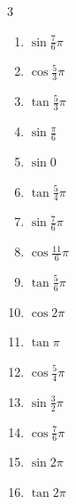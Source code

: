 \begin{multicols}{3}
\begin{enumerate}
  \item $\displaystyle \sin{\frac{7}{6}\pi}$

  \item $\displaystyle \cos{\frac{5}{3}\pi}$

  \item $\displaystyle \tan{\frac{5}{3}\pi}$

  \item $\displaystyle \sin{\frac{\pi}{6}}$

  \item $\displaystyle \sin{0}$
        \phantom{$\displaystyle =0$}

  \item $\displaystyle \tan{\frac{5}{4}\pi}$
        \phantom{$\displaystyle =1$}

  \item $\displaystyle \sin{\frac{7}{6}\pi}$

  \item $\displaystyle \cos{\frac{11}{6}\pi}$

  \item $\displaystyle \tan{\frac{5}{6}\pi}$

  \item $\displaystyle \cos{2\pi}$
        \phantom{$\displaystyle =1$}

  \item $\displaystyle \tan{\pi}$
        \phantom{$\displaystyle =0$}

  \item $\displaystyle \cos{\frac{5}{4}\pi}$

  \item $\displaystyle \sin{\frac{3}{2}\pi}$
        \phantom{$\displaystyle =-1$}

  \item $\displaystyle \cos{\frac{7}{6}\pi}$

  \item $\displaystyle \sin{2\pi}$
        \phantom{$\displaystyle =0$}

  \item $\displaystyle \tan{2\pi}$
        \phantom{$\displaystyle =0$}


\end{enumerate}
\end{multicols}
